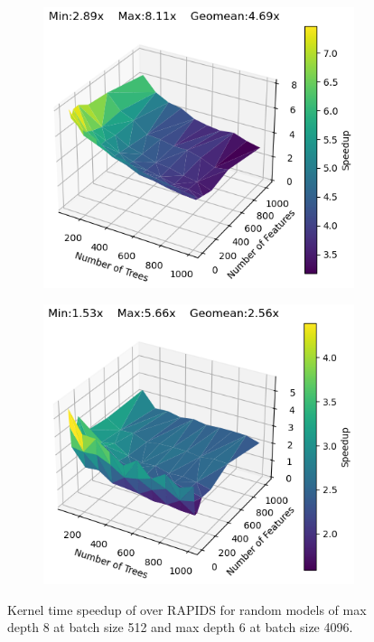 \begin{figure}[htb]
  \begin{subfigure}[t]{.475\linewidth}
    \includegraphics[width=\linewidth]{figures/RandomModels/kernel_speedup_b512_depth8.png}
    \caption{}
  \end{subfigure}
  \begin{subfigure}[t]{.475\linewidth}
    \includegraphics[width=\linewidth]{figures/RandomModels/kernel_speedup_b4096_depth6.png}
    \caption{}
  \end{subfigure}
  \caption{\label{fig:randomModels4060}Kernel time speedup of \Treebeard{} over RAPIDS for random models
  of max depth 8 at batch size 512 and max depth 6 at batch size 4096.}
\end{figure}

